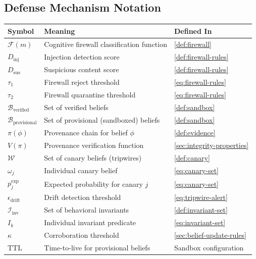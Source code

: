 \documentclass[
]{article}
\newcounter{none} %
\begin{document}
\subsection{Defense Mechanism
Notation}\label{defense-mechanism-notation}

{\def\LTcaptype{none} %
\begin{longtable}[]{@{}
  >{\raggedright\arraybackslash}p{}
  >{\raggedright\arraybackslash}p{}
  >{\raggedright\arraybackslash}p{}@{}}
\toprule\noalign{}
\begin{minipage}[b]{\linewidth}\raggedright
Symbol
\end{minipage} & \begin{minipage}[b]{\linewidth}\raggedright
Meaning
\end{minipage} & \begin{minipage}[b]{\linewidth}\raggedright
Defined In
\end{minipage} \\
\midrule\noalign{}
\endhead
\bottomrule\noalign{}
\endlastfoot
\(\mathcal{F}(m)\) & Cognitive firewall classification function &
\cref{def:firewall} \\
\(D_{\text{inj}}\) & Injection detection score &
\cref{def:firewall-rules} \\
\(D_{\text{sus}}\) & Suspicious content score &
\cref{def:firewall-rules} \\
\(\tau_1\) & Firewall reject threshold & \cref{eq:firewall-rules} \\
\(\tau_2\) & Firewall quarantine threshold & \cref{eq:firewall-rules} \\
\(\mathcal{B}_{\text{verified}}\) & Set of verified beliefs &
\cref{def:sandbox} \\
\(\mathcal{B}_{\text{provisional}}\) & Set of provisional (sandboxed)
beliefs & \cref{def:sandbox} \\
\(\pi(\phi)\) & Provenance chain for belief \(\phi\) &
\cref{def:evidence} \\
\(V(\pi)\) & Provenance verification function &
\cref{sec:integrity-properties} \\
\(\mathcal{W}\) & Set of canary beliefs (tripwires) &
\cref{def:canary} \\
\(\omega_j\) & Individual canary belief & \cref{eq:canary-set} \\
\(p_j^{\text{exp}}\) & Expected probability for canary \(j\) &
\cref{eq:canary-set} \\
\(\epsilon_{\text{drift}}\) & Drift detection threshold &
\cref{eq:tripwire-alert} \\
\(\mathcal{I}_{\text{inv}}\) & Set of behavioral invariants &
\cref{def:invariant-set} \\
\(I_k\) & Individual invariant predicate & \cref{eq:invariant-set} \\
\(\kappa\) & Corroboration threshold & \cref{sec:belief-update-rules} \\
\(\text{TTL}\) & Time-to-live for provisional beliefs & Sandbox
configuration \\
\end{longtable}
}
\end{document}
